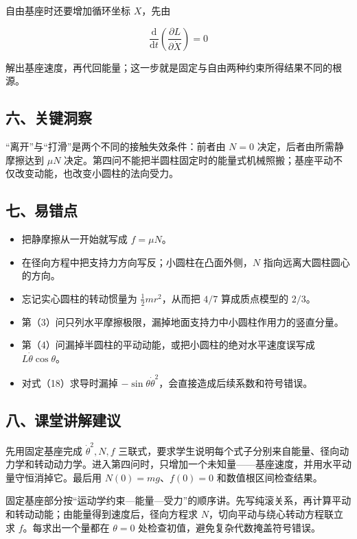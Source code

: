 \documentclass[12pt,a4paper,UTF8]{ctexart}
\newcommand{\tightlist}{\setlength{\itemsep}{0pt}\setlength{\parskip}{0pt}}
\begin{document}
自由基座时还要增加循环坐标 \(X\)，先由

\[\frac{\mathrm d}{\mathrm dt}
\left(\frac{\partial L}{\partial\dot X}\right)=0\]

解出基座速度，再代回能量；这一步就是固定与自由两种约束所得结果不同的根源。

\subsection{六、关键洞察}\label{ux516dux5173ux952eux6d1eux5bdf-1}

``离开''与``打滑''是两个不同的接触失效条件：前者由 \(N=0\)
决定，后者由所需静摩擦达到 \(\mu N\)
决定。第四问不能把半圆柱固定时的能量式机械照搬；基座平动不仅改变动能，也改变小圆柱的法向受力。

\subsection{七、易错点}\label{ux4e03ux6613ux9519ux70b9-1}

\begin{itemize}
\tightlist
\item
  把静摩擦从一开始就写成 \(f=\mu N\)。
\item
  在径向方程中把支持力方向写反；小圆柱在凸面外侧，\(N\)
  指向远离大圆柱圆心的方向。
\item
  忘记实心圆柱的转动惯量为 \(\frac12mr^2\)，从而把 \(4/7\)
  算成质点模型的 \(2/3\)。
\item
  第（3）问只列水平摩擦极限，漏掉地面支持力中小圆柱作用力的竖直分量。
\item
  第（4）问漏掉半圆柱的平动动能，或把小圆柱的绝对水平速度误写成
  \(L\dot\theta\cos\theta\)。
\item
  对式（18）求导时漏掉
  \(-\sin\theta\dot\theta^2\)，会直接造成后续系数和符号错误。
\end{itemize}

\subsection{八、课堂讲解建议}\label{ux516bux8bfeux5802ux8bb2ux89e3ux5efaux8bae-1}

先用固定基座完成 \(\dot\theta^2,N,f\)
三联式，要求学生说明每个式子分别来自能量、径向动力学和转动动力学。进入第四问时，只增加一个未知量------基座速度，并用水平动量守恒消掉它。最后用
\(N(0)=mg\)、\(f(0)=0\) 和数值根区间检查结果。

固定基座部分按``运动学约束---能量---受力''的顺序讲。先写纯滚关系，再计算平动和转动动能；由能量得到速度后，径向方程求
\(N\)，切向平动与绕心转动方程联立求 \(f\)。每求出一个量都在 \(\theta=0\)
处检查初值，避免复杂代数掩盖符号错误。
\end{document}
